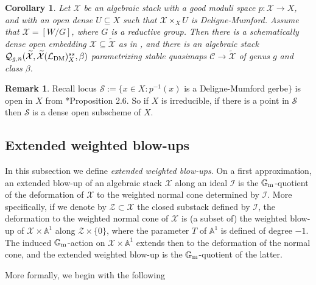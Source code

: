 \documentclass{amsart}
\newcommand{\bA}{\mathbb{A}}
\newcommand{\bG}{\mathbb{G}}
\newcommand{\sC}{\mathscr{C}}
\newcommand{\cI}{\mathcal{I}}
\newcommand{\cL}{\mathcal{L}}
\newcommand{\cQ}{\mathcal{Q}}
\newcommand{\cS}{\mathcal{S}}
\newcommand{\cX}{\mathcal{X}}
\newcommand{\cZ}{\mathcal{Z}}
\newcommand{\Gm}{\bG_{{\rm m}}}
\newcommand{\dm}{{\rm DM}}
\newtheorem{Cor}[theorem]{Corollary}
\theoremstyle{definition}
\newtheorem{Remark}[theorem]{Remark}
\theoremstyle{definition}
\begin{document}
{\begin{Cor}
    Let $\cX$ be an algebraic stack with a good moduli space $p:\cX\to X$, and with an open dense $U\subseteq X$ such that $\cX\times_XU$ is Deligne-Mumford. Assume that $\cX=[W/G]$, where $G$ is a reductive group. Then there is a schematically dense open embedding $\cX\subseteq \widetilde{\cX}$ as in , and there is an algebraic stack $\cQ_{g,n}(\widetilde{\cX}, \widetilde{\cX}(\cL_\dm)^{ss}_X,\beta)$ parametrizing stable quasimaps $\sC\to \widetilde{\cX}$ of genus $g$ and class $\beta$. 
    \end{Cor}
\begin{Remark}
    Recall locus $\cS:=\{x\in X:p^{-1}(x)$ is a Deligne-Mumford gerbe$\}$ is open in $X$ from \cite{ER21}*{Proposition 2.6}. So if $X$ is irreducible, if there is a point in $\cS$ then $\cS$ is a dense open subscheme of $X$.
\end{Remark}
\subsection{Extended weighted blow-ups}
In this subsection we define \textit{extended weighted blow-ups}.
On a first approximation, an extended blow-up of an algebraic stack $\cX$ along an ideal $\cI$ is the $\Gm$-quotient of the deformation of $\cX$ to the weighted normal cone determined by $\cI$.
More specifically, if we denote by $\cZ\subset\cX$ the closed substack defined by $\cI$, the deformation to the weighted normal cone of $\cX$ is (a subset of) the weighted blow-up of $\cX\times\bA^1$ along $\cZ\times\{0\}$, where the parameter $T$ of $\bA^1$ is defined of degree $-1$. The induced $\Gm$-action on $\cX\times\bA^1$ extends then to
the deformation of the normal cone, and the extended weighted blow-up is the $\Gm$-quotient of the latter.

More formally, we begin with the following

}
\end{document}
